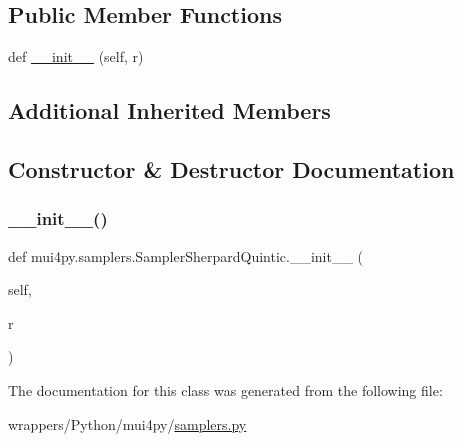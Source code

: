 \subsection*{Public Member Functions}
\begin{DoxyCompactItemize}
\item 
def \hyperlink{classmui4py_1_1samplers_1_1_sampler_sherpard_quintic_a55c8008375650fb146c0a86ecf6213ec}{\+\_\+\+\_\+init\+\_\+\+\_\+} (self, r)
\end{DoxyCompactItemize}
\subsection*{Additional Inherited Members}


\subsection{Constructor \& Destructor Documentation}
\mbox{\label{classmui4py_1_1samplers_1_1_sampler_sherpard_quintic_a55c8008375650fb146c0a86ecf6213ec}} 
\subsubsection{\texorpdfstring{\+\_\+\+\_\+init\+\_\+\+\_\+()}{\_\_init\_\_()}}
{\footnotesize\ttfamily def mui4py.\+samplers.\+Sampler\+Sherpard\+Quintic.\+\_\+\+\_\+init\+\_\+\+\_\+ (\begin{DoxyParamCaption}\item[{}]{self,  }\item[{}]{r }\end{DoxyParamCaption})}



The documentation for this class was generated from the following file\+:\begin{DoxyCompactItemize}
\item 
wrappers/\+Python/mui4py/\hyperlink{samplers_8py}{samplers.\+py}\end{DoxyCompactItemize}
